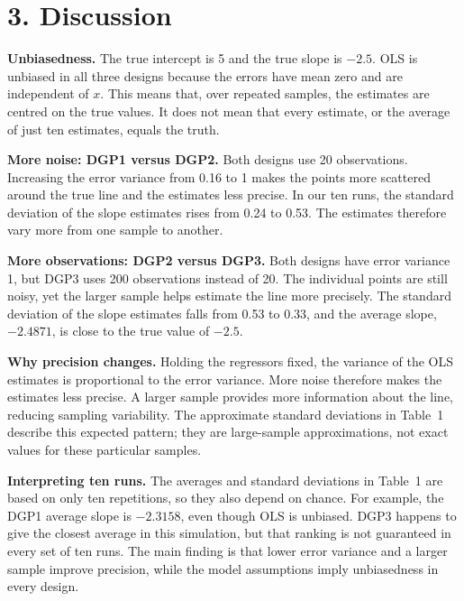 \documentclass[11pt,a4paper]{article}
\begin{document}
\newpage
\begin{table}[H]
\centering
\footnotesize
\setlength{\tabcolsep}{5pt}

\caption{OLS estimates over 10 repetitions for each DGP.}
\label{tab:res}
\end{table}

\section*{3. Discussion}
\textbf{Unbiasedness.}
The true intercept is 5 and the true slope is $-2.5$. OLS is unbiased in all three designs because the errors have mean zero and are independent of $x$. This means that, over repeated samples, the estimates are centred on the true values. It does not mean that every estimate, or the average of just ten estimates, equals the truth.

\textbf{More noise: DGP1 versus DGP2.}
Both designs use 20 observations. Increasing the error variance from 0.16 to 1 makes the points more scattered around the true line and the estimates less precise. In our ten runs, the standard deviation of the slope estimates rises from 0.24 to 0.53. The estimates therefore vary more from one sample to another.

\textbf{More observations: DGP2 versus DGP3.}
Both designs have error variance 1, but DGP3 uses 200 observations instead of 20. The individual points are still noisy, yet the larger sample helps estimate the line more precisely. The standard deviation of the slope estimates falls from 0.53 to 0.33, and the average slope, $-2.4871$, is close to the true value of $-2.5$.

\textbf{Why precision changes.}
Holding the regressors fixed, the variance of the OLS estimates is proportional to the error variance. More noise therefore makes the estimates less precise. A larger sample provides more information about the line, reducing sampling variability. The approximate standard deviations in Table~1 describe this expected pattern; they are large-sample approximations, not exact values for these particular samples.

\textbf{Interpreting ten runs.}
The averages and standard deviations in Table~1 are based on only ten repetitions, so they also depend on chance. For example, the DGP1 average slope is $-2.3158$, even though OLS is unbiased. DGP3 happens to give the closest average in this simulation, but that ranking is not guaranteed in every set of ten runs. The main finding is that lower error variance and a larger sample improve precision, while the model assumptions imply unbiasedness in every design.
\end{document}
